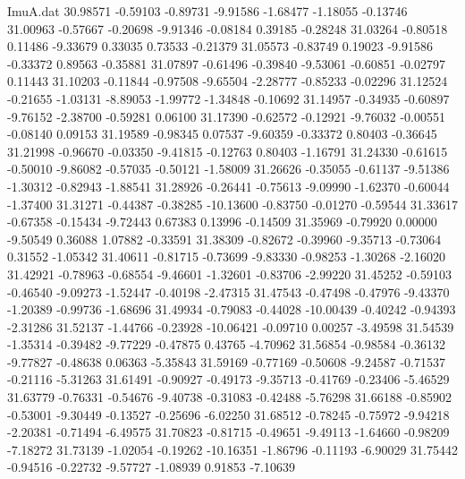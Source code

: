 \begin{filecontents}{ImuA.dat}
  30.98571   -0.59103   -0.89731   -9.91586   -1.68477   -1.18055   -0.13746
  31.00963   -0.57667   -0.20698   -9.91346   -0.08184    0.39185   -0.28248
  31.03264   -0.80518    0.11486   -9.33679    0.33035    0.73533   -0.21379
  31.05573   -0.83749    0.19023   -9.91586   -0.33372    0.89563   -0.35881
  31.07897   -0.61496   -0.39840   -9.53061   -0.60851   -0.02797    0.11443
  31.10203   -0.11844   -0.97508   -9.65504   -2.28777   -0.85233   -0.02296
  31.12524   -0.21655   -1.03131   -8.89053   -1.99772   -1.34848   -0.10692
  31.14957   -0.34935   -0.60897   -9.76152   -2.38700   -0.59281    0.06100
  31.17390   -0.62572   -0.12921   -9.76032   -0.00551   -0.08140    0.09153
  31.19589   -0.98345    0.07537   -9.60359   -0.33372    0.80403   -0.36645
  31.21998   -0.96670   -0.03350   -9.41815   -0.12763    0.80403   -1.16791
  31.24330   -0.61615   -0.50010   -9.86082   -0.57035   -0.50121   -1.58009
  31.26626   -0.35055   -0.61137   -9.51386   -1.30312   -0.82943   -1.88541
  31.28926   -0.26441   -0.75613   -9.09990   -1.62370   -0.60044   -1.37400
  31.31271   -0.44387   -0.38285  -10.13600   -0.83750   -0.01270   -0.59544
  31.33617   -0.67358   -0.15434   -9.72443    0.67383    0.13996   -0.14509
  31.35969   -0.79920    0.00000   -9.50549    0.36088    1.07882   -0.33591
  31.38309   -0.82672   -0.39960   -9.35713   -0.73064    0.31552   -1.05342
  31.40611   -0.81715   -0.73699   -9.83330   -0.98253   -1.30268   -2.16020
  31.42921   -0.78963   -0.68554   -9.46601   -1.32601   -0.83706   -2.99220
  31.45252   -0.59103   -0.46540   -9.09273   -1.52447   -0.40198   -2.47315
  31.47543   -0.47498   -0.47976   -9.43370   -1.20389   -0.99736   -1.68696
  31.49934   -0.79083   -0.44028  -10.00439   -0.40242   -0.94393   -2.31286
  31.52137   -1.44766   -0.23928  -10.06421   -0.09710    0.00257   -3.49598
  31.54539   -1.35314   -0.39482   -9.77229   -0.47875    0.43765   -4.70962
  31.56854   -0.98584   -0.36132   -9.77827   -0.48638    0.06363   -5.35843
  31.59169   -0.77169   -0.50608   -9.24587   -0.71537   -0.21116   -5.31263
  31.61491   -0.90927   -0.49173   -9.35713   -0.41769   -0.23406   -5.46529
  31.63779   -0.76331   -0.54676   -9.40738   -0.31083   -0.42488   -5.76298
  31.66188   -0.85902   -0.53001   -9.30449   -0.13527   -0.25696   -6.02250
  31.68512   -0.78245   -0.75972   -9.94218   -2.20381   -0.71494   -6.49575
  31.70823   -0.81715   -0.49651   -9.49113   -1.64660   -0.98209   -7.18272
  31.73139   -1.02054   -0.19262  -10.16351   -1.86796   -0.11193   -6.90029
  31.75442   -0.94516   -0.22732   -9.57727   -1.08939    0.91853   -7.10639

\end{filecontents}
